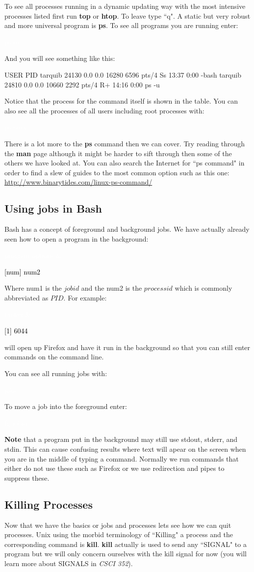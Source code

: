 \documentclass[oneside]{book}
\newcommand{\commandline}[1]{\begin{center} \colorbox{Dark}{\textcolor{white}{#1}} \end{center}}
\newcommand{\exampleout}[1]{\begin{center} \colorbox{Light}{\textcolor{black}{#1}} \end{center}}
\begin{document}
    To see all processes running in a dynamic updating way with the most intensive processes listed first run \textbf{top} or \textbf{htop}. To leave type ``q". A static but very robust and more universal program is \textbf{ps}. To see all programs you are running enter:
    \commandline{ps -u}
    And you will see something like this:
\begin{code}
    USER       PID %
    tarquib  24130  0.0  0.0  16280  6596 pts/4    Ss   13:37   0:00 -bash
    tarquib  24810  0.0  0.0  10660  2292 pts/4    R+   14:16   0:00 ps -u
\end{code}
    Notice that the process for the command itself is shown in the table. You can also see all the processes of all users including root processes with:
    \commandline{ps -aux}
    There is a lot more to the \textbf{ps} command then we can cover. Try reading through the \textbf{man} page although it might be harder to sift through then some of the others we have looked at. You can also search the Internet for ``ps command" in order to find a slew of guides to the most common option such as this one: \url{http://www.binarytides.com/linux-ps-command/}
    
    
\subsection{Using jobs in Bash}
    Bash has a concept of foreground and background jobs. We have actually already seen how to open a program in the background:
    \commandline{program options \&}
    \exampleout{[num] num2}
    Where num1 is the $jobid$ and the num2 is the $processid$ which is commonly abbreviated as $PID$.
    For example:
    \commandline{firefox \&}
    \exampleout{[1] 6044}
    will open up Firefox and have it run in the background so that you can still enter commands on the command line. 
    
    You can see all running jobs with:
    \commandline{jobs}
    To move a job into the foreground enter:
    \commandline{fg jobid}
    
    \textbf{Note} that a program put in the background may still use stdout, stderr, and stdin. This can cause confusing results where text will apear on the screen when you are in the middle of typing a command. Normally we run commands that either do not use these such as Firefox or we use redirection and pipes to suppress these. 

\subsection{Killing Processes}
    Now that we have the basics or jobs and processes lets see how we can quit processes. Unix using the morbid terminology of ``Killing" a process and the corresponding command is \textbf{kill}. \textbf{kill} actually is used to send any ``SIGNAL" to a program but we will only concern ourselves with the kill signal for now (you will learn more about SIGNALS in \textit{CSCI 352}). 
    
\end{document}
